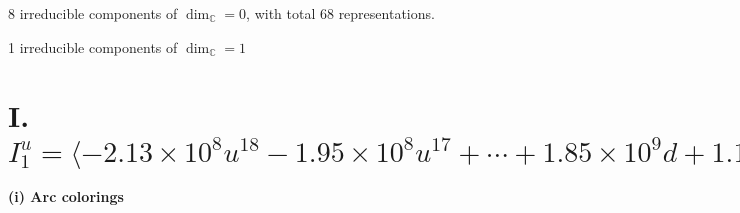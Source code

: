 \documentclass[1p]{elsarticle_modified}
\theoremstyle{definition}
\begin{document}
\raggedright * 8 irreducible components of $\dim_{\mathbb{C}}=0$, with total 68 representations.\\
\raggedright * 1 irreducible components of $\dim_{\mathbb{C}}=1$ \\
\newpage
\renewcommand{\arraystretch}{1}
\centering \section*{I. $I^u_{1}= \langle -2.13\times10^{8} u^{18}-1.95\times10^{8} u^{17}+\cdots+1.85\times10^{9} d+1.10\times10^{9},\;1.83\times10^{7} u^{18}+1.16\times10^{7} u^{17}+\cdots+2.55\times10^{8} c-4.28\times10^{8},\;-3.41\times10^{8} u^{18}-4.61\times10^{8} u^{17}+\cdots+3.70\times10^{9} b+2.24\times10^{9},\;-1.10\times10^{9} u^{18}-1.38\times10^{9} u^{17}+\cdots+7.40\times10^{9} a+9.00\times10^{9},\;u^{19}+2 u^{18}+\cdots+4 u^2-8 \rangle$}
\flushleft \textbf{(i) Arc colorings}\\
\end{document}
